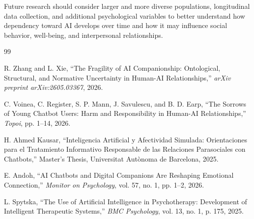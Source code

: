 \documentclass[10pt,a4paper]{article}
\begin{document}
Future research should consider larger and more diverse populations, longitudinal data collection, and additional psychological variables to better understand how dependency toward AI develops over time and how it may influence social behavior, well-being, and interpersonal relationships.
\pagebreak
\begin{thebibliography}{99}

R. Zhang and L. Xie, ``The Fragility of AI Companionship: Ontological, Structural, and Normative Uncertainty in Human-AI Relationships,'' \textit{arXiv preprint arXiv:2605.03367}, 2026.

C. Voinea, C. Register, S. P. Mann, J. Savulescu, and B. D. Earp, ``The Sorrows of Young Chatbot Users: Harm and Responsibility in Human-AI Relationships,'' \textit{Topoi}, pp. 1--14, 2026.

H. Ahmed Kausar, ``Inteligencia Artificial y Afectividad Simulada: Orientaciones para el Tratamiento Informativo Responsable de las Relaciones Parasociales con Chatbots,'' Master's Thesis, Universitat Autònoma de Barcelona, 2025.

E. Andoh, ``AI Chatbots and Digital Companions Are Reshaping Emotional Connection,'' \textit{Monitor on Psychology}, vol. 57, no. 1, pp. 1--2, 2026.

L. Spytska, ``The Use of Artificial Intelligence in Psychotherapy: Development of Intelligent Therapeutic Systems,'' \textit{BMC Psychology}, vol. 13, no. 1, p. 175, 2025.

\end{thebibliography}

\pagebreak

\end{document}
